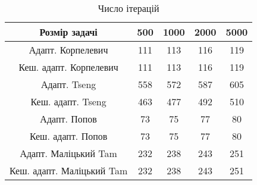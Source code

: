 \begin{table}[H]
	\centering
	\begin{tabular}{|c||c|c|c|c|}\hline
		Розмір задачі & 500 & 1000 & 2000 & 5000 \\ \hline \hline
		Адапт. Корпелевич & 111 & 113 & 116 & 119 \\ \hline
		Кеш. адапт. Корпелевич & 111 & 113 & 116 & 119 \\ \hline
		Адапт. Tseng & 558 & 572 & 587 & 605 \\ \hline
		Кеш. адапт. Tseng & 463 & 477 & 492 & 510 \\ \hline
		Адапт. Попов & 73 & 75 & 77 & 80 \\ \hline
		Кеш. адапт. Попов & 73 & 75 & 77 & 80 \\ \hline
		Адапт. Маліцький Tam & 232 & 238 & 243 & 251 \\ \hline
		Кеш. адапт. Маліцький Tam & 232 & 238 & 243 & 251 \\ \hline
	\end{tabular}
	\caption{Число ітерацій}
\end{table}
